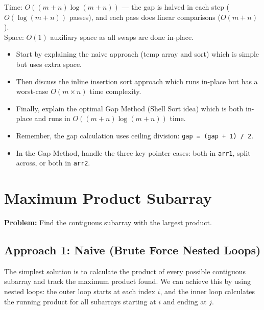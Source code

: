 \documentclass[12pt,a4paper,oneside]{book}
\begin{document}
\begin{complexity}
Time: $O((m+n)\log(m+n))$ --- the gap is halved in each step ($O(\log(m+n))$ passes), and each pass does linear comparisons ($O(m+n)$).\\
Space: $O(1)$ auxiliary space as all swaps are done in-place.
\end{complexity}

\begin{interviewcorner}
\begin{itemize}
  \item Start by explaining the naive approach (temp array and sort) which is simple but uses extra space.
  \item Then discuss the inline insertion sort approach which runs in-place but has a worst-case $O(m \times n)$ time complexity.
  \item Finally, explain the optimal Gap Method (Shell Sort idea) which is both in-place and runs in $O((m+n)\log(m+n))$ time.
  \item Remember, the gap calculation uses ceiling division: \texttt{gap = (gap + 1) / 2}.
  \item In the Gap Method, handle the three key pointer cases: both in \texttt{arr1}, split across, or both in \texttt{arr2}.
\end{itemize}
\end{interviewcorner}

\section{Maximum Product Subarray}

\textbf{Problem:} Find the contiguous subarray with the largest product.

\subsection{Approach 1: Naive (Brute Force Nested Loops)}
The simplest solution is to calculate the product of every possible contiguous subarray and track the maximum product found. We can achieve this by using nested loops: the outer loop starts at each index $i$, and the inner loop calculates the running product for all subarrays starting at $i$ and ending at $j$.
\end{document}
